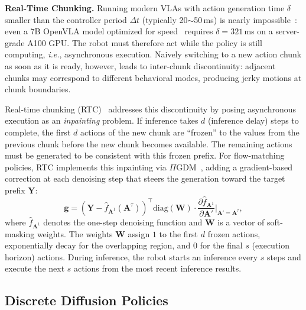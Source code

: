 \documentclass{article}
\newcommand{\ie}{\textit{i.e.}}
\begin{document}
\textbf{Real-Time Chunking.}
Running modern VLAs with action generation time $\delta$ smaller than the controller period $\Delta t$ (typically 20$\sim$50\,ms) is nearly impossible~\citep{black2025real}: even a 7B OpenVLA model optimized for speed~\citep{kim2025fine, kim2024openvla} requires $\delta = 321$\,ms on a server-grade A100 GPU.
The robot must therefore act while the policy is still computing, \ie, asynchronous execution.
Naively switching to a new action chunk as soon as it is ready, however, leads to inter-chunk discontinuity: adjacent chunks may correspond to different behavioral modes, producing jerky motions at chunk boundaries.

Real-time chunking (RTC)~\citep{black2025real} addresses this discontinuity by posing asynchronous execution as an \emph{inpainting} problem.
If inference takes $d$ (inference delay) steps to complete, the first $d$ actions of the new chunk are ``frozen'' to the values from the previous chunk before the new chunk becomes available.
The remaining actions must be generated to be consistent with this frozen prefix.
For flow-matching policies, RTC implements this inpainting via $\Pi$GDM~\citep{song2023pseudoinverse}, adding a gradient-based correction at each denoising step that steers the generation toward the target prefix $\mathbf{Y}$:
\begin{equation}
    \mathbf{g} = \left(\mathbf{Y} - \hat{f}_{\mathbf{A}^1}(\mathbf{A}^\tau)\right)^\top \text{diag}(\mathbf{W}) \cdot \frac{\partial \hat{f}_{\mathbf{A}^1}}{\partial \mathbf{A}'}\bigg|_{\mathbf{A}'=\mathbf{A}^\tau},
    \label{eq:guidance}
\end{equation}
where $\hat{f}_{\mathbf{A}^1}$ denotes the one-step denoising function and $\mathbf{W}$ is a vector of soft-masking weights.
The weights $\mathbf{W}$ assign $1$ to the first $d$ frozen actions, exponentially decay for the overlapping region, and $0$ for the final $s$ (execution horizon) actions.
During inference, the robot starts an inference every $s$ steps and execute the next $s$ actions from the most recent inference results.


\subsection{Discrete Diffusion Policies}
\label{sec:bg_discrete}
\end{document}
